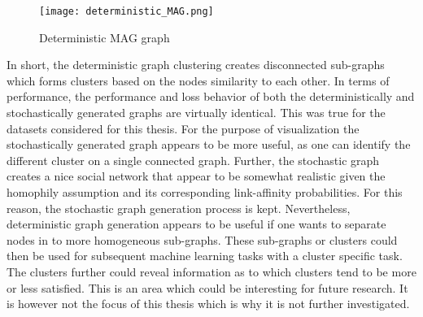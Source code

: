   \begin{figure}[h]
		\centering
		\texttt{[image: deterministic\_MAG.png]}
		\caption{Deterministic MAG graph}
        \label{fig:det_MAG}
  \end{figure}

  \noindent In short, the deterministic graph clustering creates disconnected 
  sub-graphs which forms clusters based on the nodes similarity to each other.
  In terms of performance, the performance and loss behavior of both the
  deterministically and stochastically generated graphs are virtually
  identical. This was true for the datasets considered for this thesis. For the 
  purpose of visualization the stochastically generated graph appears
  to be more useful, as one can identify the different cluster on a single
  connected graph. Further, the stochastic graph creates a nice social
  network that appear to be somewhat realistic given the homophily assumption
  and its corresponding link-affinity probabilities. For this reason, the
  stochastic graph generation process is kept. Nevertheless, deterministic
  graph generation appears to be useful if one wants to separate nodes in to
  more homogeneous sub-graphs. These sub-graphs or clusters could then be used
  for subsequent machine learning tasks with a cluster specific task. The
  clusters further could reveal information as to which clusters tend to be
  more or less satisfied. This is an area which could be interesting for future
  research. It is however not the focus of this thesis which is why it is not
  further investigated. 
  

